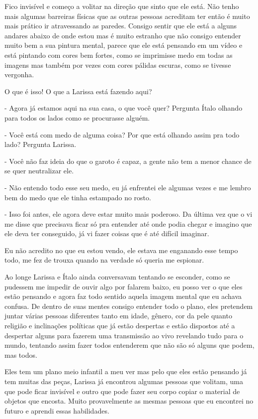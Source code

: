 Fico invisível e começo a volitar na direção que sinto que ele está. Não tenho mais algumas barreiras físicas que as outras pessoas acreditam ter então é muito mais prático ir atravessando as paredes. Consigo sentir que ele está a alguns andares abaixo de onde estou mas é muito estranho que não consigo entender muito bem a sua pintura mental, parece que ele está pensando em um vídeo e está pintando com cores bem fortes, como se imprimisse medo em todas as imagens mas também por vezes com cores pálidas escuras, como se tivesse vergonha.

O que é isso! O que a Larissa está fazendo aqui?

- Agora já estamos aqui na sua casa, o que você quer? Pergunta Ítalo olhando para todos os lados como se procurasse alguém.

- Você está com medo de alguma coisa? Por que está olhando assim pra todo lado? Pergunta Larissa.

- Você não faz ideia do que o garoto é capaz, a gente não tem a menor chance de se quer neutralizar ele.

- Não entendo todo esse seu medo, eu já enfrentei ele algumas vezes e me lembro bem do medo que ele tinha estampado no rosto.

- Isso foi antes, ele agora deve estar muito mais poderoso. Da última vez que o vi me disse que precisava ficar só pra entender até onde podia chegar e imagino que ele deva ter conseguido, já vi fazer coisas que é até difícil imaginar.

Eu não acredito no que eu estou vendo, ele estava me enganando esse tempo todo, me fez de trouxa quando na verdade só queria me espionar.

Ao longe Larissa e Ítalo ainda conversavam tentando se esconder, como se pudessem me impedir de ouvir algo por falarem baixo, eu posso ver o que eles estão pensando e agora faz todo sentido aquela imagem mental que eu achava confusa. De dentro de suas mentes consigo entender todo o plano, eles pretendem juntar várias pessoas diferentes tanto em idade, gênero, cor da pele quanto religião e inclinações políticas que já estão despertas e estão dispostos até a despertar alguns para fazerem uma transmissão ao vivo revelando tudo para o mundo, tentando assim fazer todos entenderem que não são só alguns que podem, mas todos.

Eles tem um plano meio infantil a meu ver mas pelo que eles estão pensando já tem muitas das peças, Larissa já encontrou algumas pessoas que volitam, uma que pode ficar invisível e outro que pode fazer seu corpo copiar o material de objetos que encosta. Muito provavelmente as mesmas pessoas que eu encontrei no futuro e aprendi essas habilidades.

